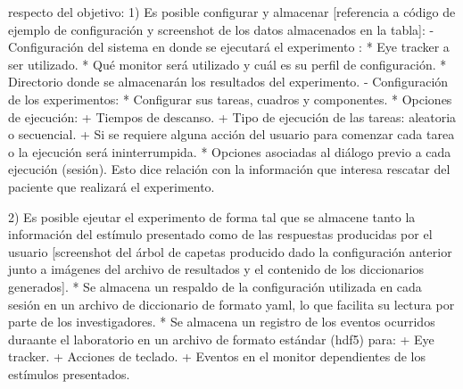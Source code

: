 \documentclass[\main/main.tex]{subfiles}
\begin{document}
	respecto del objetivo:
		1) Es posible configurar y almacenar [referencia a código de ejemplo de configuración y screenshot de los datos almacenados en la tabla]:
			- Configuración del sistema en donde se ejecutará el experimento :
				* Eye tracker a ser utilizado.
				* Qué monitor será utilizado y cuál es su perfil de configuración.
				* Directorio donde se almacenarán los resultados del experimento.
			- Configuración de los experimentos:
				* Configurar sus tareas, cuadros y componentes.
				* Opciones de ejecución:
					+ Tiempos de descanso.
					+ Tipo de ejecución de las tareas: aleatoria o secuencial.
					+ Si se requiere alguna acción del usuario para comenzar cada tarea o la ejecución será ininterrumpida.
				* Opciones asociadas al diálogo previo a cada ejecución (sesión). Esto dice relación con la información que interesa rescatar del paciente que realizará el experimento.

		2) Es posible ejeutar el experimento de forma tal que se almacene tanto la información del estímulo presentado como de las respuestas producidas por el usuario [screenshot del árbol de capetas producido dado la configuración anterior junto a imágenes del archivo de resultados y el contenido de los diccionarios generados].
			* Se almacena un respaldo de la configuración utilizada en cada sesión en un archivo de diccionario de formato yaml, lo que facilita su lectura por parte de los investigadores.
			* Se almacena un registro de los eventos ocurridos duraante el laboratorio en un archivo de formato estándar (hdf5) para:
				+ Eye tracker.
				+ Acciones de teclado.  
				+ Eventos en el monitor dependientes de los estímulos presentados.

\end{document}
